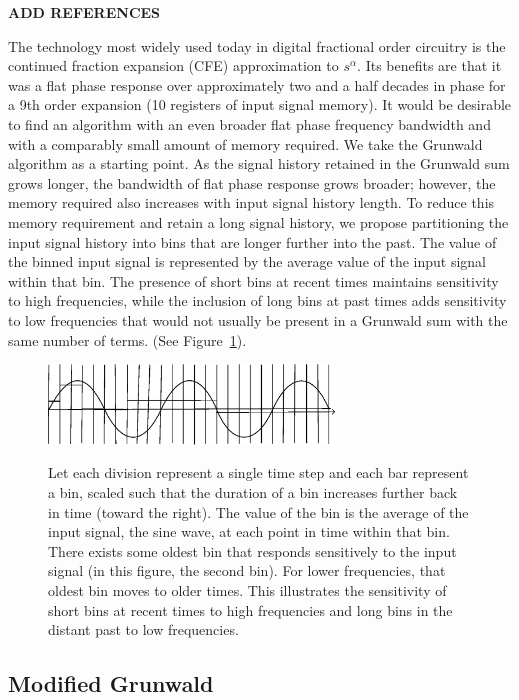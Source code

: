 {\bf ADD REFERENCES}

The technology most widely used today in digital fractional order
circuitry is the continued fraction expansion (CFE) approximation to
$s^\alpha$. Its benefits are that it was a flat phase response over
approximately two and a half decades in phase for a 9th order
expansion (10 registers of input signal memory). It would be desirable
to find an algorithm with an even broader flat phase frequency
bandwidth and with a comparably small amount of memory required. We
take the Grunwald algorithm as a starting point. As the signal history
retained in the Grunwald sum grows longer, the bandwidth of flat phase
response grows broader; however, the memory required also increases
with input signal history length. To reduce this memory requirement
and retain a long signal history, we propose partitioning the input
signal history into bins that are longer further into the past. The
value of the binned input signal is represented by the average value
of the input signal within that bin. The presence of short bins at
recent times maintains sensitivity to high frequencies, while the
inclusion of long bins at past times adds sensitivity to low
frequencies that would not usually be present in a Grunwald sum with
the same number of terms. (See Figure~\ref{fig:freqScaling}).

\begin{figure}
\includegraphics[width=3in]{sensitivityIsFreqDependent.eps}
\label{fig:freqScaling}
\caption{Let each division represent a single time step and each bar represent a bin, scaled such that the duration of a bin increases further back in time (toward the right). The value of the bin is the average of the input signal, the sine wave, at each point in time within that bin. There exists some oldest bin that responds sensitively to the input signal (in this figure, the second bin). For lower frequencies, that oldest bin moves to older times. This illustrates the sensitivity of short bins at recent times to high frequencies and long bins in the distant past to low frequencies.}
\end{figure}


\subsection{Modified Grunwald}

